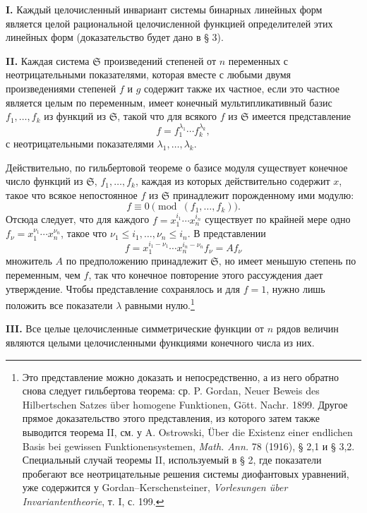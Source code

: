 \documentclass[11pt]{article}
\providecommand{\frS}{\mathfrak S}
\begin{document}
\textbf{I.} Каждый целочисленный инвариант системы бинарных линейных форм является целой рациональной целочисленной функцией определителей этих линейных форм (доказательство будет дано в § 3).

\textbf{II.} Каждая система \(\frS\) произведений степеней от \(n\) переменных с неотрицательными показателями, которая вместе с любыми двумя произведениями степеней \(f\) и \(g\) содержит также их частное, если это частное является целым по переменным, имеет конечный мультипликативный базис \(f_1,\ldots,f_k\) из функций из \(\frS\), такой что для всякого \(f\) из \(\frS\) имеется представление
\[
        f=f_1^{\lambda_1}\cdots f_k^{\lambda_k},
\]
с неотрицательными показателями \(\lambda_1,\ldots,\lambda_k\).

Действительно, по гильбертовой теореме о базисе модуля существует конечное число функций из \(\frS\), \(f_1,\ldots,f_k\), каждая из которых действительно содержит \(x\), такое что всякое непостоянное \(f\) из \(\frS\) принадлежит порожденному ими модулю:
\[
        f\equiv0\pmod{(f_1,\ldots,f_k)}.
\]
Отсюда следует, что для каждого \(f=x_1^{i_1}\cdots x_n^{i_n}\) существует по крайней мере одно \(f_\nu=x_1^{\nu_1}\cdots x_n^{\nu_n}\), такое что \(\nu_1\le i_1,\ldots,\nu_n\le i_n\). В представлении
\[
        f=x_1^{i_1-\nu_1}\cdots x_n^{i_n-\nu_n} f_\nu = A f_\nu
\]
множитель \(A\) по предположению принадлежит \(\frS\), но имеет меньшую степень по переменным, чем \(f\), так что конечное повторение этого рассуждения дает утверждение. Чтобы представление сохранялось и для \(f=1\), нужно лишь положить все показатели \(\lambda\) равными нулю.\footnote{Это представление можно доказать и непосредственно, а из него обратно снова следует гильбертова теорема: ср. P. Gordan, Neuer Beweis des Hilbertschen Satzes über homogene Funktionen, Gött. Nachr. 1899. Другое прямое доказательство этого представления, из которого затем также выводится теорема II, см. у A. Ostrowski, Über die Existenz einer endlichen Basis bei gewissen Funktionensystemen, \emph{Math. Ann.} 78 (1916), § 2,1 и § 3,2. Специальный случай теоремы II, используемый в § 2, где показатели пробегают все неотрицательные решения системы диофантовых уравнений, уже содержится у Gordan--Kerschensteiner, \emph{Vorlesungen über Invariantentheorie}, т. I, с. 199.}

\textbf{III.} Все целые целочисленные симметрические функции от \(n\) рядов величин являются целыми целочисленными функциями конечного числа из них.
\end{document}
